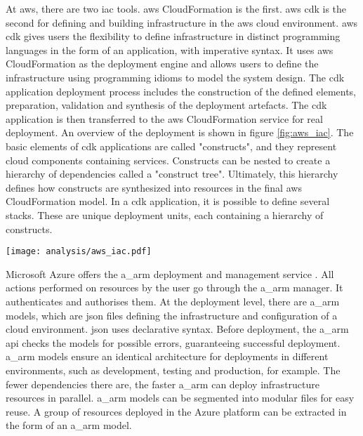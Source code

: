 At \gls{aws}, there are two \acrshort{iac} tools. \gls{aws} CloudFormation \cite{aws_cloudformation} is the first. \gls{aws} \acrfull{cdk} \cite{aws_cdk} is the second for defining and building infrastructure in the \gls{aws} \gls{cloud} environment. \gls{aws} \acrshort{cdk} gives users the flexibility to define infrastructure in distinct programming languages in the form of an application, with imperative syntax. It uses \gls{aws} CloudFormation as the deployment engine and allows users to define the infrastructure using programming idioms to model the system design. The \acrshort{cdk} application deployment process includes the construction of the defined elements, preparation, validation and synthesis of the deployment artefacts. The \acrshort{cdk} application is then transferred to the \gls{aws} CloudFormation service for real deployment. An overview of the deployment is shown in figure \ref{fig:aws_iac}. The basic elements of \acrshort{cdk} applications are called "constructs", and they represent \gls{cloud} components containing services. Constructs can be nested to create a hierarchy of dependencies called a "construct tree". Ultimately, this hierarchy defines how constructs are synthesized into resources in the final \gls{aws} CloudFormation model. In a \acrshort{cdk} application, it is possible to define several stacks. These are unique deployment units, each containing a hierarchy of constructs. \cite{iac_tools}
\begin{center}
    \begingroup
    \texttt{[image: analysis/aws\_iac.pdf]}
    \label{fig:aws_iac}
    \endgroup
\end{center}

Microsoft Azure offers the \acrfull{a_arm} deployment and management service \cite{azure_arm}. All actions performed on resources by the user go through the \acrshort{a_arm} manager. It authenticates and authorises them. At the deployment level, there are \acrshort{a_arm} models, which are \acrshort{json} files defining the infrastructure and configuration of a \gls{cloud} environment. \acrshort{json} uses declarative syntax. Before deployment, the \acrshort{a_arm} \acrshort{api} checks the models for possible errors, guaranteeing successful deployment. \acrshort{a_arm} models ensure an identical architecture for deployments in different environments, such as development, testing and production, for example. The fewer dependencies there are, the faster \acrshort{a_arm} can deploy infrastructure resources in parallel. \acrshort{a_arm} models can be segmented into modular files for easy reuse. A group of resources deployed in the Azure platform can be extracted in the form of an \acrshort{a_arm} model. \cite{iac_tools}

